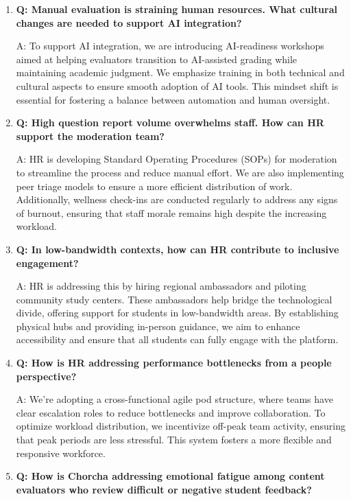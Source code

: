 \documentclass[12pt,a4paper,oneside]{book}
\begin{document}
    \begin{enumerate}
\item \textbf{Q: Manual evaluation is straining human resources. What cultural changes are needed to support AI integration?}

A: To support AI integration, we are introducing AI-readiness workshops aimed at helping evaluators transition to AI-assisted grading while maintaining academic judgment. We emphasize training in both technical and cultural aspects to ensure smooth adoption of AI tools. This mindset shift is essential for fostering a balance between automation and human oversight.

\item \textbf{Q: High question report volume overwhelms staff. How can HR support the moderation team?}

A: HR is developing Standard Operating Procedures (SOPs) for moderation to streamline the process and reduce manual effort. We are also implementing peer triage models to ensure a more efficient distribution of work. Additionally, wellness check-ins are conducted regularly to address any signs of burnout, ensuring that staff morale remains high despite the increasing workload.

\item \textbf{Q: In low-bandwidth contexts, how can HR contribute to inclusive engagement?}

A: HR is addressing this by hiring regional ambassadors and piloting community study centers. These ambassadors help bridge the technological divide, offering support for students in low-bandwidth areas. By establishing physical hubs and providing in-person guidance, we aim to enhance accessibility and ensure that all students can fully engage with the platform.

\item \textbf{Q: How is HR addressing performance bottlenecks from a people perspective?} 

A: We’re adopting a cross-functional agile pod structure, where teams have clear escalation roles to reduce bottlenecks and improve collaboration. To optimize workload distribution, we incentivize off-peak team activity, ensuring that peak periods are less stressful. This system fosters a more flexible and responsive workforce.



\item \textbf{Q: How is Chorcha addressing emotional fatigue among content evaluators who review difficult or negative student feedback?} 


\end{enumerate}
\end{document}
